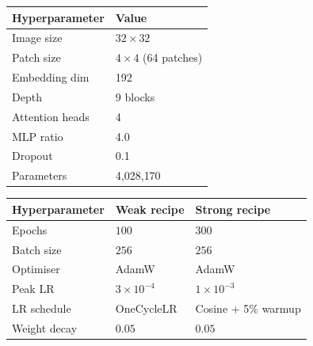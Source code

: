 \documentclass[10pt,twocolumn]{article}
\begin{document}
\begin{table}[ht]
    \centering
    \begin{minipage}[t]{0.36\linewidth}
        \vspace{0pt}
        \centering
        \begin{tabular}{ll}
            \toprule
            Hyperparameter  & Value                   \\
            \midrule
            Image size      & $32\times32$            \\
            Patch size      & $4\times4$ (64 patches) \\
            Embedding dim   & 192                     \\
            Depth           & 9 blocks                \\
            Attention heads & 4                       \\
            MLP ratio       & 4.0                     \\
            Dropout         & 0.1                     \\
            Parameters      & 4{,}028{,}170           \\
            \bottomrule
        \end{tabular}
        \label{tab:vit-config}
    \end{minipage}
    \hfill
    \begin{minipage}[t]{0.58\linewidth}
        \vspace{0pt}
        \centering
        \begin{tabular}{lll}
            \toprule
            Hyperparameter  & Weak recipe      & Strong recipe                   \\
            \midrule
            Epochs          & $100$            & $300$                           \\
            Batch size      & $256$            & $256$                           \\
            Optimiser       & AdamW            & AdamW                           \\
            Peak LR         & $3\times10^{-4}$ & $1\times10^{-3}$                \\
            LR schedule     & OneCycleLR       & Cosine + 5\% warmup             \\
            Weight decay    & $0.05$           & $0.05$                          \\

\end{tabular}
\end{minipage}
\end{table}
\end{document}
